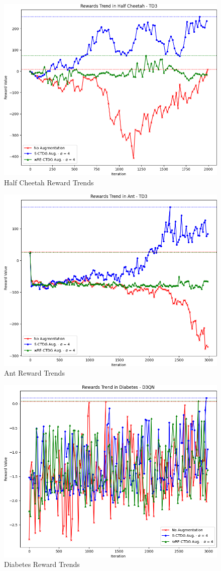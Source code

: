 \begin{figure}[H]
    \centering
    \includegraphics[width=.8\textwidth]{figures/ch5/rew_halfcheetah.png}
    \caption{Half Cheetah Reward Trends}
    \label{fig:rew_cheetah}
\end{figure}

\begin{figure}[H]
    \centering
    \includegraphics[width=.8\textwidth]{figures/ch5/rew_ant.png}
    \caption{Ant Reward Trends}
    \label{fig:rew_ant}
\end{figure}

\begin{figure}[H]
    \centering
    \includegraphics[width=.8\textwidth]{figures/ch5/rew_diabetes.png}
    \caption{Diabetes Reward Trends}
    \label{fig:rew_diabetes}
\end{figure}

